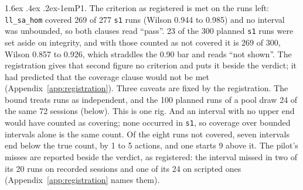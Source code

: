 \documentclass[11pt]{article}
\makeatletter
\renewcommand\paragraph{\@startsection{paragraph}{4}{\z@}%
  {1.6ex \@plus .4ex \@minus .2ex}{-1em}{\normalfont\normalsize\bfseries}}
\makeatother
\begin{document}
\paragraph{P1.} The criterion as registered is met on the runs left:
\texttt{ll\_sa\_hom} covered 269 of 277 \texttt{s1} runs (Wilson 0.944 to 0.985) and no
interval was unbounded, so both clauses read ``pass''. 23 of the 300 planned \texttt{s1}
runs were set aside on integrity, and with those counted as not covered it is 269 of
300, Wilson 0.857 to 0.926, which straddles the 0.90 bar and reads ``not shown''. The
registration gives that second figure no criterion and puts it beside the verdict; it
had predicted that the coverage clause would not be met
(Appendix~\ref{app:registration}). Three
caveats are fixed by the registration. The bound treats runs as independent, and the 100
planned runs of a pool draw 24 of the same 72 sessions (below). This is one rig. And an
interval with no upper end
would have counted as covering; none occurred in \texttt{s1}, so coverage over bounded
intervals alone is the same count. Of the eight runs not covered, seven intervals end
below the true count, by 1 to 5 actions, and one starts 9 above it. The pilot's misses
are reported beside the verdict, as registered: the interval missed in two of its 20
runs on recorded sessions and one of its 24 on scripted ones
(Appendix~\ref{app:registration} names them).
\end{document}

